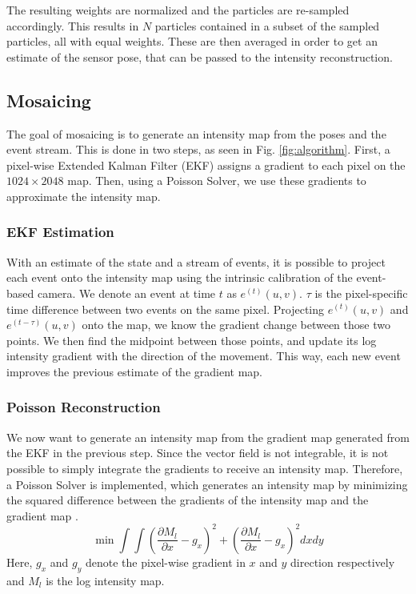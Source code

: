 \documentclass[10pt,twocolumn,letterpaper]{article}
\begin{document}
The resulting weights are normalized and the particles are re-sampled accordingly. This results in $N$ particles contained in a subset of the sampled particles, all with equal weights. These are then averaged in order to get an estimate of the sensor pose, that can be passed to the intensity reconstruction.

\subsection{Mosaicing}
The goal of mosaicing is to generate an intensity map from the poses and the event stream. This is done in two steps, as seen in Fig. \ref{fig:algorithm}.
First, a pixel-wise Extended Kalman Filter (EKF) assigns a gradient to each pixel on the $1024 \times 2048$ map. Then, using a Poisson Solver, we use these gradients to approximate the intensity map.

\subsubsection*{EKF Estimation}
With an estimate of the state and a stream of events, it is possible to project each event onto the intensity map using the intrinsic calibration of the event-based camera. We denote an event at time $t$ as $e^{(t)}(u,v)$. $\tau$ is the pixel-specific time difference between two events on the same pixel. Projecting $e^{(t)}(u,v)$ and $e^{(t-\tau)}(u,v)$ onto the map, we know the gradient change between those two points. We then find the midpoint between those points, and update its log intensity gradient with the direction of the movement. 
This way, each  new event improves the previous estimate of the gradient map.

\subsubsection*{Poisson Reconstruction}
We now want to generate an intensity map from the gradient map generated from the EKF in the previous step. Since the vector field is not integrable, it is not possible to simply integrate the gradients to receive an intensity map. Therefore, a Poisson Solver is implemented, which generates an intensity map by minimizing the squared difference between the gradients of the intensity map and the gradient map  \cite{kim2014simultaneous}. 
$$
\min \int \int \left( \frac{\partial M_l}{\partial x}-g_x  \right)^2 +
\left(\frac{\partial M_l}{\partial x}-g_x
\right)^2 dxdy
$$
Here, $g_x$ and $g_y$ denote the pixel-wise gradient in $x$ and $y$ direction respectively and $M_l$ is the log intensity map.
\end{document}
